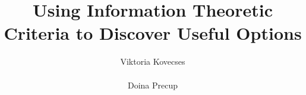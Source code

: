 \documentclass{acm_proc_article-sp}
\begin{document}
\title{Using Information Theoretic Criteria to Discover Useful Options}
%
%
%
%
%

%
\author{
%
%
\alignauthor
Viktoria Kovecses\\
       \\
\alignauthor
Doina Precup\\
       \\
}
\end{document}
